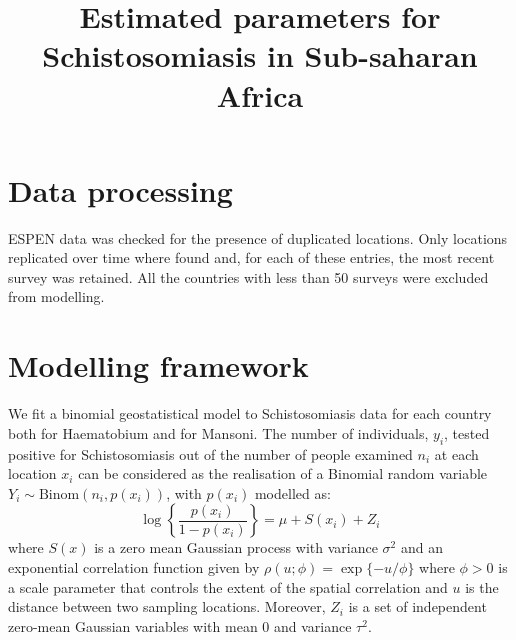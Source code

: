\documentclass[11pt,]{article}
\title{Estimated parameters for Schistosomiasis in Sub-saharan Africa  }
\author{}
\date{}
\begin{document}
	
%

{%
\setlength{\parindent}{0pt}
\thispagestyle{plain}
{\fontsize{18}{20}\selectfont\raggedright 
\maketitle  %

}

{
   \vskip 13.5pt\relax \normalsize\fontsize{11}{12} 
 

}

}






\vskip 6.5pt


\noindent  \hypertarget{data-processing}{%
\section{Data processing}\label{data-processing}}

ESPEN data was checked for the presence of duplicated locations. Only
locations replicated over time where found and, for each of these
entries, the most recent survey was retained. All the countries with
less than 50 surveys were excluded from modelling.

\hypertarget{modelling-framework}{%
\section{Modelling framework}\label{modelling-framework}}

We fit a binomial geostatistical model to Schistosomiasis data for each
country both for Haematobium and for Mansoni. The number of individuals,
\(y_i\), tested positive for Schistosomiasis out of the number of people
examined \(n_i\) at each location \(x_i\) can be considered as the
realisation of a Binomial random variable
\(Y_i \sim \text{Binom}(n_i, p(x_i))\), with \(p(x_i)\) modelled as:
\[\log\left\{\frac{p(x_i)}{1 - p(x_i)}\right\}=\mu+S(x_i) + Z_i\] where
\(S(x)\) is a zero mean Gaussian process with variance \(\sigma^2\) and
an exponential correlation function given by
\(\rho(u;\phi)=\exp\{-u/\phi\}\) where \(\phi > 0\) is a scale parameter
that controls the extent of the spatial correlation and \(u\) is the
distance between two sampling locations. Moreover, \(Z_i\) is a set of
independent zero-mean Gaussian variables with mean \(0\) and variance
\(\tau^2\).
\end{document}
